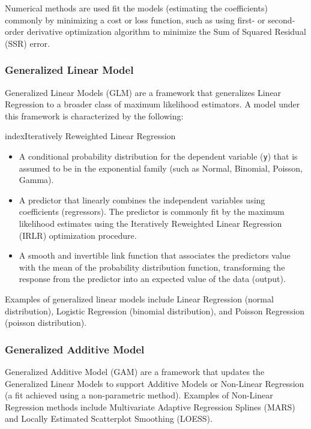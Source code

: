 \begin{bibunit}
Numerical methods are used fit the models (estimating the coefficients) commonly by minimizing a cost or loss function, such as using first- or second-order derivative optimization algorithm to minimize the Sum of Squared Residual (SSR) error.

\subsubsection{Generalized Linear Model}
Generalized Linear Models (GLM) are a framework that generalizes Linear Regression to a broader class of maximum likelihood estimators. A model under this framework is characterized by the following:

index{Iteratively Reweighted Linear Regression}
\begin{itemize}
	\item A conditional probability distribution for the dependent variable (\texttt{y}) that is assumed to be in the exponential family (such as Normal, Binomial, Poisson, Gamma).
	\item A predictor that linearly combines the independent variables using coefficients (regressors). The predictor is commonly fit by the maximum likelihood estimates using the Iteratively Reweighted Linear Regression (IRLR) optimization procedure.
	\item A smooth and invertible link function that associates the predictors value with the mean of the probability distribution function, transforming the response from the predictor into an expected value of the data (output).
\end{itemize}

Examples of generalized linear models include Linear Regression (normal distribution), Logistic Regression (binomial distribution), and Poisson Regression (poisson distribution). 

\subsubsection{Generalized Additive Model}
Generalized Additive Model (GAM) are a framework that updates the Generalized Linear Models to support Additive Models or Non-Linear Regression (a fit achieved using a non-parametric method).
Examples of Non-Linear Regression methods include Multivariate Adaptive Regression Splines (MARS) and Locally Estimated Scatterplot Smoothing (LOESS).



\end{bibunit}
